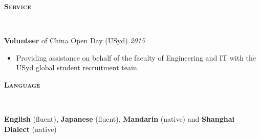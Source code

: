 \documentclass[letterpaper, 10pt]{article}
\newenvironment{changemargin}[2]{%
  \begin{list}{}{%
      \setlength{\topsep}{0pt}%
      \setlength{\leftmargin}{#1}%
      \setlength{\rightmargin}{#2}%
      \setlength{\listparindent}{\parindent}%
      \setlength{\itemindent}{\parindent}%
      \setlength{\parsep}{\parskip}%
    }%
  \item[]}{\end{list}
}
\newcommand{\lineover}{
  \begin{changemargin}{-0.05in}{-0.05in}
    \vspace*{-8pt}
    \hrulefill \\
    \vspace*{-2pt}
  \end{changemargin}
}
\newcommand{\header}[1]{
  \begin{changemargin}{-0.5in}{-0.5in}
    \textbf{\scshape{#1}}\\
    \lineover
  \end{changemargin}
}
\newenvironment{body} {
  \vspace*{-16pt}
  \begin{changemargin}{-0.25in}{-0.5in}
  }
  {\end{changemargin}
}
\begin{document}
\header{Service}
\begin{body}
	\vspace{14pt}
	
	\textbf{Volunteer} of China Open Day (USyd) \hfill
	\emph{2015}
	\vspace{-2pt}
	\begin{itemize}
		\setlength{\itemindent}{0in}
		\setlength{\itemsep}{0in}
		\item Providing assistance on behalf of the faculty of Engineering and IT with the USyd global student recruitment team. 
	\end{itemize}
	

\end{body}
\smallskip
 \header{Language}

 \begin{body}
   \vspace{14pt}
   \textbf{English} (fluent), \textbf{Japanese} (fluent), \textbf{Mandarin} (native) and \textbf{Shanghai Dialect} (native) \\
 \end{body}
\end{document}
